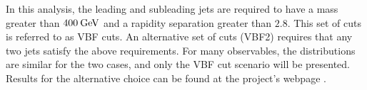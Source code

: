 
In this analysis, the leading and subleading jets are required to have
a mass greater than $400\text{\:GeV}$ and a rapidity separation greater than
$2.8$. This set of cuts is referred to as VBF cuts. An alternative set
of cuts (VBF2) requires that any two jets satisfy the above
requirements. For many observables, the distributions are similar for
the two cases, and only the VBF cut scenario will be presented.
Results for the alternative choice can be found at the project's
webpage \cite{webpage}.


